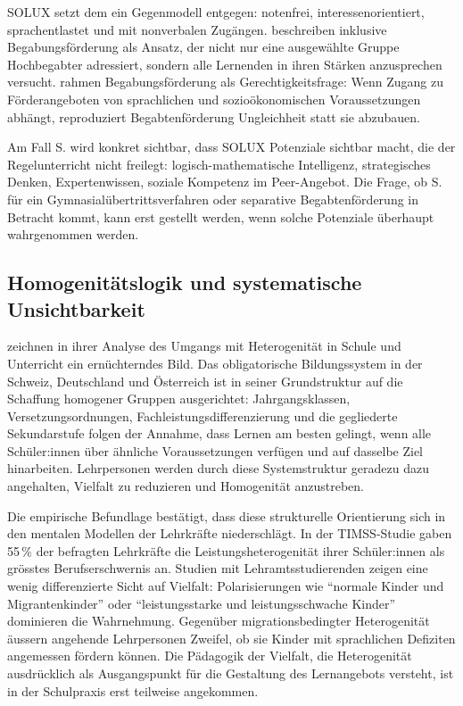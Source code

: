 \documentclass[ngerman, a4paper]{article}
\begin{document}
SOLUX setzt dem ein Gegenmodell entgegen: notenfrei, interessenorientiert,
sprachentlastet und mit nonverbalen Zugängen. \textcite{weigand2021separativ} beschreiben inklusive
Begabungsförderung als Ansatz, der nicht nur eine ausgewählte Gruppe Hochbegabter
adressiert, sondern alle Lernenden in ihren Stärken anzusprechen versucht.
\textcite{sedmak2021bildungsgerechtigkeit} rahmen Begabungsförderung als
Gerechtigkeitsfrage: Wenn Zugang zu Förderangeboten von sprachlichen und
sozioökonomischen Voraussetzungen abhängt, reproduziert Begabtenförderung
Ungleichheit statt sie abzubauen.
 
Am Fall S. wird konkret sichtbar, dass SOLUX Potenziale sichtbar macht, die der
Regelunterricht nicht freilegt: logisch-mathematische Intelligenz, strategisches Denken,
Expertenwissen, soziale Kompetenz im Peer-Angebot. Die Frage, ob S. für ein
Gymnasialübertrittsverfahren oder separative Begabtenförderung in Betracht kommt,
kann erst gestellt werden, wenn solche Potenziale überhaupt wahrgenommen werden.


\subsection{Homogenitätslogik und systematische Unsichtbarkeit}

\textcite{buholzer2010allegleich} zeichnen in ihrer Analyse des Umgangs mit Heterogenität
in Schule und Unterricht ein ernüchterndes Bild. Das obligatorische Bildungssystem in
der Schweiz, Deutschland und Österreich ist in seiner Grundstruktur auf die Schaffung
homogener Gruppen ausgerichtet: Jahrgangsklassen, Versetzungsordnungen,
Fachleistungsdifferenzierung und die gegliederte Sekundarstufe folgen der Annahme,
dass Lernen am besten gelingt, wenn alle Schüler:innen über ähnliche Voraussetzungen
verfügen und auf dasselbe Ziel hinarbeiten. Lehrpersonen werden durch diese
Systemstruktur geradezu dazu angehalten, Vielfalt zu reduzieren und Homogenität
anzustreben.

Die empirische Befundlage bestätigt, dass diese strukturelle Orientierung sich in den
mentalen Modellen der Lehrkräfte niederschlägt. In der TIMSS-Studie gaben 55\,\%
der befragten Lehrkräfte die Leistungsheterogenität ihrer Schüler:innen als grösstes
Berufserschwernis an. Studien mit Lehramtsstudierenden zeigen eine wenig differenzierte
Sicht auf Vielfalt: Polarisierungen wie \enquote{normale Kinder und Migrantenkinder} oder
\enquote{leistungsstarke und leistungsschwache Kinder} dominieren die Wahrnehmung.
Gegenüber migrationsbedingter Heterogenität äussern angehende Lehrpersonen Zweifel,
ob sie Kinder mit sprachlichen Defiziten angemessen fördern können. Die Pädagogik
der Vielfalt, die Heterogenität ausdrücklich als Ausgangspunkt für die Gestaltung
des Lernangebots versteht, ist in der Schulpraxis erst teilweise angekommen.
\end{document}
